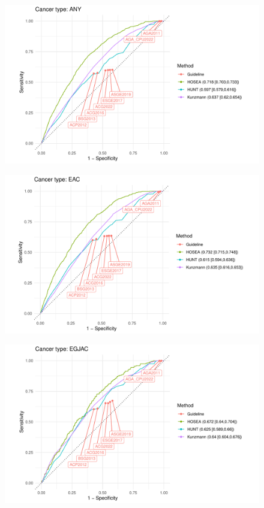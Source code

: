 \documentclass[12pt]{article}
\begin{document}
\begin{figure}[h]
\centering
\includegraphics[width=1.0\textwidth]{figures/comparison_ANY.pdf}
\end{figure}

\begin{figure}[h]
\centering
\includegraphics[width=1.0\textwidth]{figures/comparison_EAC.pdf}
\end{figure}

\begin{figure}[h]
\centering
\includegraphics[width=1.0\textwidth]{figures/comparison_EGJAC.pdf}
\end{figure}
\end{document}

